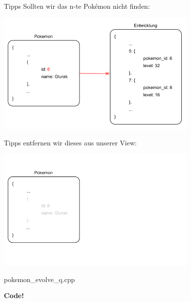 \begin{frame}{Tipps}
    Sollten wir das n-te Pokémon nicht finden:

    \begin{center}
        \includegraphics[width=0.75\textwidth]{pictures/example_6.pdf}
    \end{center}
\end{frame}

\begin{frame}{Tipps}
    entfernen wir dieses aus unserer View:

    \begin{center}
        \includegraphics[width=0.75\textwidth]{pictures/example_7.pdf}
    \end{center}
\end{frame}

\begin{frame}{pokemon\_evolve\_q.cpp}
    \begin{center}
        \textbf{Code!}
    \end{center}
\end{frame}